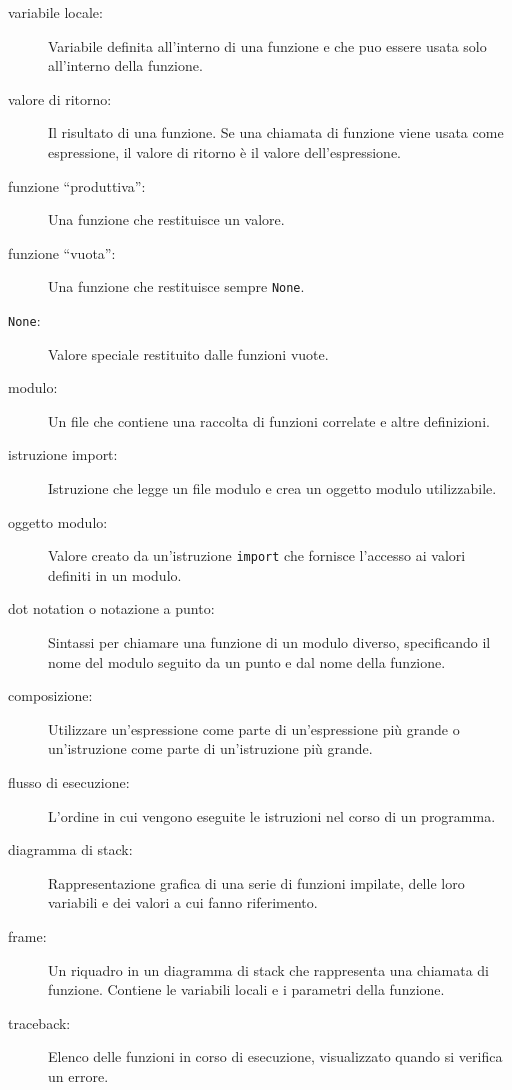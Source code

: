 \documentclass[10pt]{book}
\begin{document}
\begin{description}
\item[variabile locale:]  Variabile definita all'interno di una funzione e che puo essere usata solo all'interno della funzione.

\item[valore di ritorno:]  Il risultato di una funzione. Se una chiamata di funzione viene usata come espressione, il valore di ritorno è il valore dell'espressione.

\item[funzione ``produttiva'':] Una funzione che restituisce un valore.

\item[funzione ``vuota'':] Una funzione che restituisce sempre {\tt None}.

\item[{\tt None}:]  Valore speciale restituito dalle funzioni vuote.

\item[modulo:] Un file che contiene una raccolta di funzioni correlate e altre definizioni.

\item[istruzione import:] Istruzione che legge un file modulo e crea un oggetto modulo utilizzabile.

\item[oggetto modulo:] Valore creato da un'istruzione {\tt import} che fornisce l'accesso ai valori definiti in un modulo.

\item[dot notation o notazione a punto:]  Sintassi per chiamare una funzione di un modulo diverso, specificando il nome del modulo seguito da un punto e dal nome della funzione.

\item[composizione:] Utilizzare un'espressione come parte di un'espressione più grande o un'istruzione come parte di un'istruzione più grande.

\item[flusso di esecuzione:]  L'ordine in cui vengono eseguite le istruzioni nel corso di un programma.

\item[diagramma di stack:]  Rappresentazione grafica di una serie di funzioni impilate, delle loro variabili e dei valori a cui fanno riferimento.

\item[frame:]  Un riquadro in un diagramma di stack che rappresenta una chiamata di funzione. Contiene le variabili locali e i parametri della funzione.

\item[traceback:]  Elenco delle funzioni in corso di esecuzione, visualizzato quando si verifica un errore.


\end{description}
\end{document}
